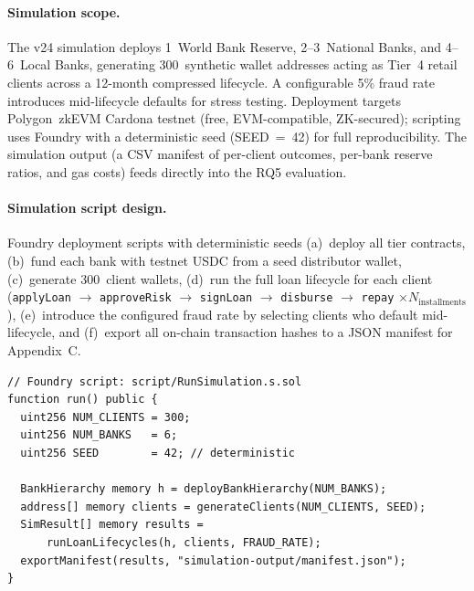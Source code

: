 \documentclass[12pt,a4paper]{report}
\begin{document}
\paragraph{Simulation scope.}
The v24 simulation deploys 1~World Bank Reserve, 2--3~National Banks, and 4--6~Local Banks, generating 300~synthetic wallet addresses acting as Tier~4 retail clients across a 12-month compressed lifecycle. A configurable 5\% fraud rate introduces mid-lifecycle defaults for stress testing. Deployment targets Polygon~zkEVM Cardona testnet (free, EVM-compatible, ZK-secured); scripting uses Foundry with a deterministic seed (SEED~=~42) for full reproducibility. The simulation output (a CSV manifest of per-client outcomes, per-bank reserve ratios, and gas costs) feeds directly into the RQ5 evaluation.

\paragraph{Simulation script design.}
Foundry deployment scripts with deterministic seeds (a)~deploy all tier contracts, (b)~fund each bank with testnet USDC from a seed distributor wallet, (c)~generate 300~client wallets, (d)~run the full loan lifecycle for each client (\texttt{applyLoan} $\to$ \texttt{approveRisk} $\to$ \texttt{signLoan} $\to$ \texttt{disburse} $\to$ \texttt{repay} $\times N_\text{installments}$), (e)~introduce the configured fraud rate by selecting clients who default mid-lifecycle, and (f)~export all on-chain transaction hashes to a JSON manifest for Appendix~C.

\begin{lstlisting}[language=Solidity, caption={Foundry simulation entry-point (structure)}]
// Foundry script: script/RunSimulation.s.sol
function run() public {
  uint256 NUM_CLIENTS = 300;
  uint256 NUM_BANKS   = 6;
  uint256 SEED        = 42; // deterministic

  BankHierarchy memory h = deployBankHierarchy(NUM_BANKS);
  address[] memory clients = generateClients(NUM_CLIENTS, SEED);
  SimResult[] memory results =
      runLoanLifecycles(h, clients, FRAUD_RATE);
  exportManifest(results, "simulation-output/manifest.json");
}
\end{lstlisting}
\end{document}
